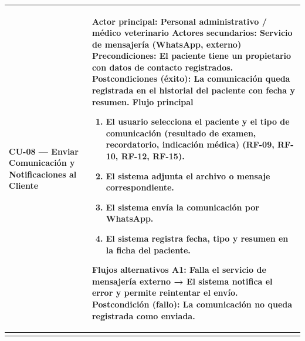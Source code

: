 \documentclass[
]{article}
\newcounter{none} %
\begin{document}
{\def\LTcaptype{none} %
\begin{longtable}[]{|
  >{\raggedright\arraybackslash}p{}|
  >{\raggedright\arraybackslash}p{}|}
\hline
\begin{minipage}[b]{\linewidth}\raggedright
\textbf{CU-08 --- Enviar Comunicación y Notificaciones al Cliente}
\end{minipage} & \begin{minipage}[b]{\linewidth}\raggedright
\textbf{Actor principal:} Personal administrativo / médico veterinario
\textbf{Actores secundarios:} Servicio de mensajería (WhatsApp, externo)
\textbf{Precondiciones:} El paciente tiene un propietario con datos de
contacto registrados. \textbf{Postcondiciones (éxito):} La comunicación queda registrada en el
historial del paciente con fecha y resumen. \textbf{Flujo principal}

\begin{enumerate}
\def\labelenumi{\arabic{enumi}.}
\item
  El usuario selecciona el paciente y el tipo de comunicación (resultado
  de examen, recordatorio, indicación médica) (RF-09, RF-10, RF-12,
  RF-15).
\item
  El sistema adjunta el archivo o mensaje correspondiente.
\item
  El sistema envía la comunicación por WhatsApp.
\item
  El sistema registra fecha, tipo y resumen en la ficha del paciente.
\end{enumerate}

\textbf{Flujos alternativos} A1: Falla el servicio de mensajería externo → El sistema notifica el
error y permite reintentar el envío. \textbf{Postcondición (fallo):} La comunicación no queda registrada como
enviada.
\end{minipage} \\
\hline
\endhead
\hline
\endlastfoot
\end{longtable}
}
\end{document}
